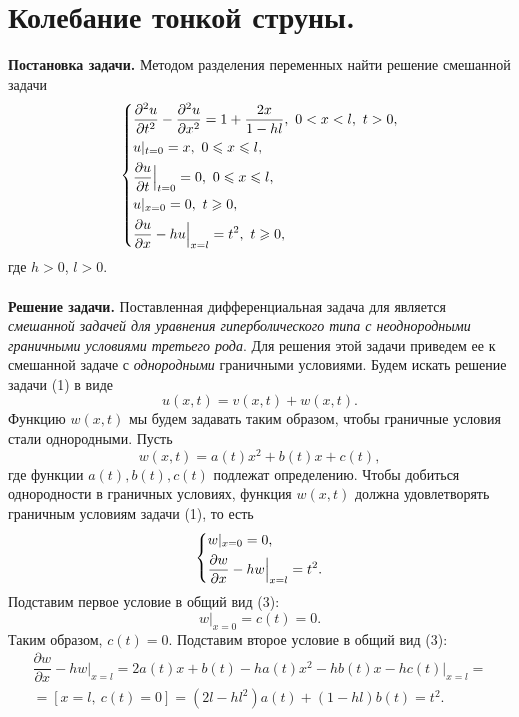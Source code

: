 \documentclass[a4paper, 12pt]{report}
\date{}
\numberwithin{equation}{section}
\renewcommand{\leq}{\leqslant}
\renewcommand{\geq}{\geqslant}
\renewcommand{\d}{\partial}
\begin{document}
	\section*{Колебание тонкой струны.}
	\textbf{Постановка задачи.}
	Методом разделения переменных найти решение смешанной задачи
	\begin{equation}
		\begin{dcases}
			\dfrac{\d^2 u}{\d t^2} - \dfrac{\d^2 u}{\d x^2} = 1 + \dfrac{2x}{1-hl},\ 0<x<l,\ t>0,\\
			u|_{t=0} = x,\ 0\leq x\leq l,\\
			\dfrac{\d u}{\d t}\Big|_{t=0} = 0,\ 0\leq x\leq l,\\
			u|_{x=0} = 0,\ t\geq 0,\\
			\dfrac{\d u}{\d x} - hu\Big|_{x=l} = t^2,\ t \geq 0,
		\end{dcases}
	\end{equation}
	где $h>0$, $l > 0$.\\\\
	\textbf{Решение задачи.}
	Поставленная дифференциальная задача для является \textit{смешанной задачей для уравнения гиперболического типа с неоднородными граничными условиями третьего рода}. Для решения этой задачи приведем ее к смешанной задаче с \textit{однородными} граничными условиями. Будем искать решение задачи (1) в виде
	\begin{equation}
		u(x,t) = v(x,t) + w(x,t).
	\end{equation}
	Функцию $w(x,t)$ мы будем задавать таким образом, чтобы граничные условия стали однородными. Пусть
	\begin{equation}
		w(x,t) = a(t)x^2 + b(t)x + c(t),
	\end{equation}
	где функции $a(t), b(t), c(t)$ подлежат определению. Чтобы добиться однородности в граничных условиях, функция $w(x,t)$ должна удовлетворять граничным условиям задачи (1), то есть
	$$\begin{dcases}
		w|_{x=0} = 0, \\
		\dfrac{\d w}{\d x} - hw\Big|_{x=l} = t^2.
	\end{dcases}$$
	Подставим первое условие в общий вид (3):
	$$w|_{x=0} = c(t) = 0.$$
	Таким образом, $c(t) = 0$. Подставим второе условие в общий вид (3):
	\begin{multline*}
		\dfrac{\d w}{\d x} - hw\Big|_{x=l} = 2a(t)x + b(t) - ha(t)x^2 - hb(t)x - hc(t)\Big|_{x=l}  =\\= [x=l,\ c(t)=0] = (2l - hl^2)a(t) +(1-hl)b(t) =t^2.
	\end{multline*}
\end{document}
